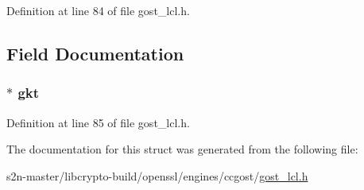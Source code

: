 Definition at line 84 of file gost\+\_\+lcl.\+h.



\subsection{Field Documentation}
\subsubsection[{\texorpdfstring{gkt}{gkt}}]{$\ast$ gkt}\hypertarget{struct_g_o_s_t___c_l_i_e_n_t___k_e_y___e_x_c_h_a_n_g_e___p_a_r_a_m_s_ac7bfcc626a7ee8238cf2b8a2953dae50}{}\label{struct_g_o_s_t___c_l_i_e_n_t___k_e_y___e_x_c_h_a_n_g_e___p_a_r_a_m_s_ac7bfcc626a7ee8238cf2b8a2953dae50}


Definition at line 85 of file gost\+\_\+lcl.\+h.



The documentation for this struct was generated from the following file\+:\begin{DoxyCompactItemize}
\item 
s2n-\/master/libcrypto-\/build/openssl/engines/ccgost/\hyperlink{gost__lcl_8h}{gost\+\_\+lcl.\+h}\end{DoxyCompactItemize}
